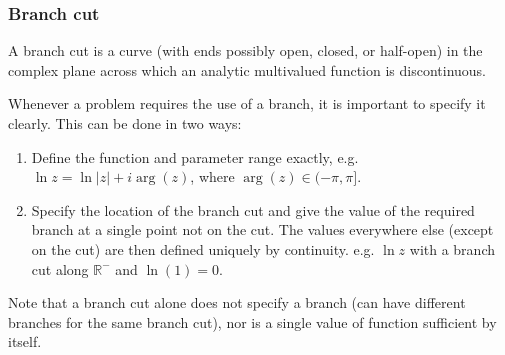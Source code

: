 \documentclass[a4paper]{article}
\begin{document}
\subsubsection{Branch cut}
\begin{defi}
A branch cut is a curve (with ends possibly open, closed, or half-open) in the complex plane across which an analytic multivalued function is discontinuous. 
\end{defi}
Whenever a problem requires the use of a branch, it is important to specify it clearly. This can be done in two ways:
\begin{enumerate}
    \item Define the function and parameter range exactly, e.g. $\ln z=\ln|z|+i\arg(z)$, where $\arg(z)\in(-\pi,\pi]$.
    \item Specify the location of the branch cut and give the value of the required branch at a single point not on the cut. The values everywhere else (except on the cut) are then defined uniquely by continuity. e.g. $\ln z$ with a branch cut along $\mathbb{R}^-$ and $\ln(1)=0$.
\end{enumerate}
\begin{remarks}\leavevmode
Note that a branch cut alone does not specify a branch (can have different branches for the same branch cut), nor is a single value of function sufficient by itself.
\end{remarks}
\end{document}
